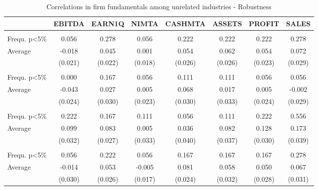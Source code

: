 \begin{table}

\caption{\label{tab:table-oa6}Correlations in firm fundamentals among unrelated industries - Robustness}
\centering
\begin{tabular}[t]{lccccccc}
\toprule
  & EBITDA & EARN1Q & NIMTA & CASHMTA & ASSETS & PROFIT & SALES\\
\midrule
\addlinespace[0.3em]
\multicolumn{8}{l}{\textbf{Full Sample}}\\
\hspace{1em}Frequ. p<5\% & 0.056 & 0.278 & 0.056 & 0.222 & 0.222 & 0.222 & 0.278\\
\hspace{1em}Average & -0.018 & 0.045 & 0.001 & 0.054 & 0.062 & 0.054 & 0.072\\
\hspace{1em} & (0.021) & (0.022) & (0.018) & (0.026) & (0.026) & (0.023) & (0.029)\\
\addlinespace[0.3em]
\multicolumn{8}{l}{\textbf{Pre-GFC}}\\
\hspace{1em}Frequ. p<5\% & 0.000 & 0.167 & 0.056 & 0.111 & 0.111 & 0.056 & 0.056\\
\hspace{1em}Average & -0.043 & 0.027 & 0.005 & 0.068 & 0.017 & 0.005 & -0.002\\
\hspace{1em} & (0.024) & (0.030) & (0.023) & (0.030) & (0.033) & (0.024) & (0.029)\\
\addlinespace[0.3em]
\multicolumn{8}{l}{\textbf{Post-GFC}}\\
\hspace{1em}Frequ. p<5\% & 0.222 & 0.167 & 0.111 & 0.056 & 0.111 & 0.222 & 0.556\\
\hspace{1em}Average & 0.099 & 0.083 & 0.005 & 0.036 & 0.082 & 0.128 & 0.173\\
\hspace{1em} & (0.032) & (0.027) & (0.033) & (0.040) & (0.037) & (0.030) & (0.039)\\
\addlinespace[0.3em]
\multicolumn{8}{l}{\textbf{Ex-Recessions}}\\
\hspace{1em}Frequ. p<5\% & 0.056 & 0.222 & 0.056 & 0.167 & 0.167 & 0.167 & 0.278\\
\hspace{1em}Average & -0.014 & 0.053 & -0.005 & 0.081 & 0.058 & 0.050 & 0.067\\
\hspace{1em} & (0.030) & (0.026) & (0.017) & (0.024) & (0.032) & (0.028) & (0.031)\\

\end{tabular}
\end{table}
